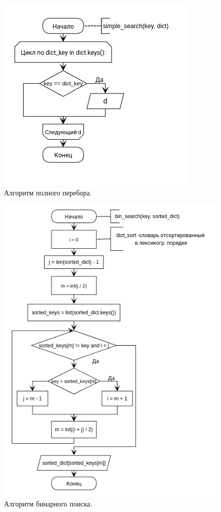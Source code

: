 \documentclass[12pt]{report}
\begin{document}
\begin{figure}[h]
	\begin{center}
		\includegraphics[scale=0.6]{full_search.jpg}
		\caption{Алгоритм полного перебора.}
		\label{fig:full}
	\end{center}
\end{figure}

\begin{figure}[h]
	\begin{center}
		\includegraphics[scale=0.9]{bin_search.png}
		\caption{Алгоритм бинарного поиска.}
		\label{fig:bin}
	\end{center}
\end{figure}
\end{document}
